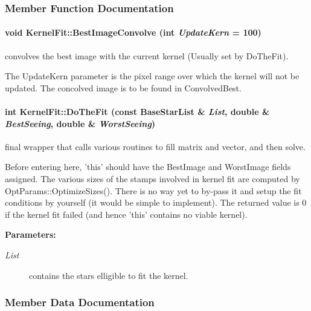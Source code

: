 \subsubsection{Member Function Documentation}
\paragraph{\setlength{\rightskip}{0pt plus 5cm}void Kernel\-Fit::Best\-Image\-Convolve (int {\em Update\-Kern} = 100)}\hfill\label{class_kernelfit_a21}


convolves the best image with the current kernel (Usually set by Do\-The\-Fit).

The Update\-Kern parameter is the pixel range over which the kernel will not be updated. The concolved image is to be found in Convolved\-Best. 
\paragraph{\setlength{\rightskip}{0pt plus 5cm}int Kernel\-Fit::Do\-The\-Fit (const Base\-Star\-List \& {\em List}, double \& {\em Best\-Seeing}, double \& {\em Worst\-Seeing})}\hfill\label{class_kernelfit_a18}


final wrapper that calls various routines to fill matrix and vector, and then solve.

Before entering here, 'this' should have the Best\-Image and Worst\-Image fields assigned. The various sizes of the stamps involved in kernel fit are computed by Opt\-Params::Optimize\-Sizes(). There is no way yet to by-pass it and setup the fit conditions by yourself (it would be simple to implement). The returned value is 0 if the kernel fit failed (and hence 'this' contains no viable kernel). \begin{Desc}
\item[{\bf Parameters: }]\par
\begin{description}
\item[
{\em List}]contains the stars elligible to fit the kernel. \end{description}
\end{Desc}


\subsubsection{Member Data Documentation}
